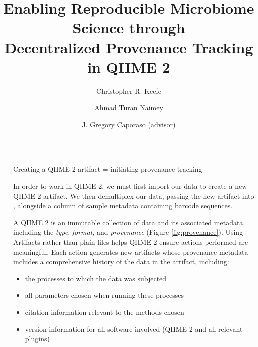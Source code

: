 \documentclass[final]{beamer}
\title{Enabling Reproducible Microbiome Science through \\ Decentralized Provenance Tracking in QIIME 2}
\author{Christopher R. Keefe \and Ahmad Turan Naimey \and J. Gregory Caporaso (advisor)}
\institute[shortinst]{The Pathogen and Microbiom Institute at Northern Arizona University}
\newlength{\sepwidth}
\newlength{\colwidth}
\newcommand{\separatorcolumn}{\begin{column}{\sepwidth}\end{column}}
\begin{document}
\begin{frame}[t]
\begin{columns}[t]
\separatorcolumn

\begin{column}{\colwidth}


  \begin{block}{Creating a QIIME 2 artifact = initiating provenance tracking}

   In order to work in QIIME 2, we must first import our data to create a new
   QIIME 2 artifact. We then demultiplex our data, passing the new artifact
   into , alongside a column of sample metadata containing
   barcode sequences.

   \begin{tcolorbox}
   [width=\textwidth, colframe=blue]
   {A QIIME 2  is an immutable collection of data and its associated
           metadata, including the \textit{type}, \textit{format}, and \textit{provenance} (Figure \ref{fig:provenance}).
   Using Artifacts rather than plain files helps QIIME 2 ensure actions
   performed are meaningful. Each action generates new artifacts whose
   provenance metadata includes a comprehensive history of the data in the
   artifact, including:}
    \begin{itemize}
      \item {the processes to which the data was subjected}
      \item {all parameters chosen when running these processes}
      \item {citation information relevant to the methods chosen}
      \item {version information for all software involved (QIIME 2 and all relevant plugins)}
    \end{itemize}
    \end{tcolorbox}
  \end{block}


\end{column}
\end{columns}
\end{frame}
\end{document}
